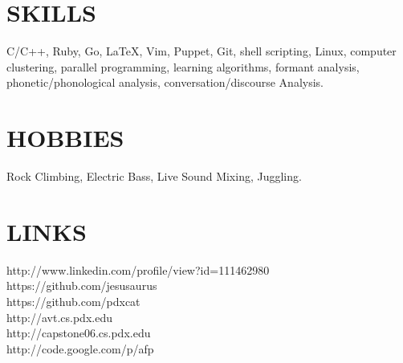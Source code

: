 \documentclass[overlapped]{res}
\begin{document}
\begin{resume}
\section{SKILLS} 
\vspace{7pt} 
C/C++, Ruby, Go, LaTeX, Vim, Puppet, Git, shell scripting, Linux, computer clustering, parallel programming, learning algorithms, formant analysis, phonetic/phonological analysis, conversation/discourse Analysis.

\section{HOBBIES} 
\vspace{7pt} 
Rock Climbing, Electric Bass, Live Sound Mixing, Juggling.

\section{LINKS}
\vspace{7pt}
http://www.linkedin.com/profile/view?id=111462980\\
https://github.com/jesusaurus\\
https://github.com/pdxcat\\
http://avt.cs.pdx.edu\\
http://capstone06.cs.pdx.edu\\
http://code.google.com/p/afp\\

\end{resume}
\end{document}
